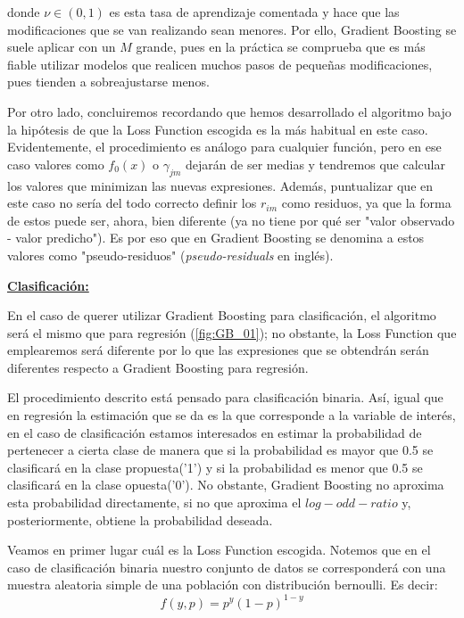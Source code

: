 \documentclass[12pt,twoside]{article}
\begin{document}
\noindent
donde $\nu \in (0, 1)$ es esta tasa de aprendizaje comentada y hace que las modificaciones que se van realizando sean menores. Por ello, Gradient Boosting se suele aplicar con un $M$ grande, pues en la práctica se comprueba que es más fiable utilizar modelos que realicen muchos pasos de pequeñas modificaciones, pues tienden a sobreajustarse menos.

Por otro lado, concluiremos recordando que hemos desarrollado el algoritmo bajo la hipótesis de que la Loss Function escogida es la más habitual en este caso. Evidentemente, el procedimiento es análogo para cualquier función, pero en ese caso valores como $f_0(x)$ o $\gamma_{jm}$ dejarán de ser medias y tendremos que calcular los valores que minimizan las nuevas expresiones. Además, puntualizar que en este caso no sería del todo correcto definir los $r_{im}$ como residuos, ya que la forma de estos puede ser, ahora, bien diferente (ya no tiene por qué ser "valor observado - valor predicho"). Es por eso que en Gradient Boosting se denomina a estos valores como "pseudo-residuos" (\textit{pseudo-residuals} en inglés).



\bigskip \bigskip \bigskip

\textbf{\underline{Clasificación: }}

En el caso de querer utilizar Gradient Boosting para clasificación, el algoritmo será el mismo que para regresión (\ref{fig:GB_01}); no obstante, la Loss Function que emplearemos será diferente por lo que las expresiones que se obtendrán serán diferentes respecto a Gradient Boosting para regresión.

El procedimiento descrito está pensado para clasificación binaria. Así, igual que en regresión la estimación que se da es la que corresponde a la variable de interés, en el caso de clasificación estamos interesados en estimar la probabilidad de pertenecer a cierta clase de manera que si la probabilidad es mayor que 0.5 se clasificará en la clase propuesta('1') y si la probabilidad es menor que 0.5 se clasificará en la clase opuesta('0'). No obstante, Gradient Boosting no aproxima esta probabilidad directamente, si no que aproxima el $log-odd-ratio$ y, posteriormente, obtiene la probabilidad deseada.

Veamos en primer lugar cuál es la Loss Function escogida. Notemos que en el caso de clasificación binaria nuestro conjunto de datos se corresponderá con una muestra aleatoria simple de una población con distribución bernoulli. Es decir:
\begin{equation*}
f(y, p) = p^y(1-p)^{1-y}
\end{equation*}
\end{document}
